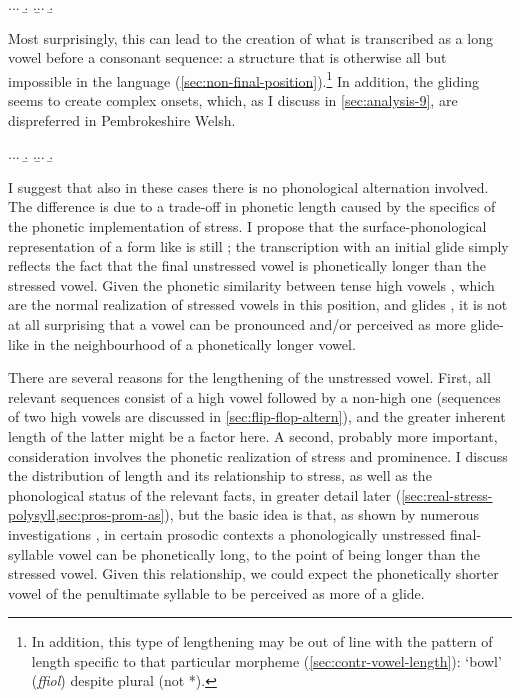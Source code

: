 \ex.\a.\label{diod}\a.
\b.
\z.\b.\label{bues}\a.
\b.

Most surprisingly, this can lead to the creation of what is transcribed as a long vowel before a consonant sequence: a structure that is otherwise all but impossible in the language (\cref{sec:non-final-position}).\footnote{In addition, this type of lengthening may be out of line with the pattern of length specific to that particular morpheme (\cref{sec:contr-vowel-length}):  `bowl' (\emph{ffiol}) despite plural \ipa{[ˈfjole]} (not *\ipa{[fjoːle]}).} In addition, the gliding seems to create complex onsets, which, as I discuss in \cref{sec:analysis-9}, are dispreferred in Pembrokeshire Welsh.

\ex.\a.\a.
\b.
\z.\b.\a.
\b.

I suggest that also in these cases there is no phonological alternation involved. The difference is due to a trade-off in phonetic length caused by the specifics of the phonetic implementation of stress. I propose that the surface\hyp phonological representation of a form like  is still \ipa{[ˈdiːolχ]}; the transcription with an initial glide simply reflects the fact that the final unstressed vowel is phonetically longer than the stressed vowel. Given the phonetic similarity between tense high vowels , which are the normal realization of stressed vowels in this position, and glides , it is not at all surprising that a vowel can be pronounced and/or perceived as more glide-like in the neighbourhood of a phonetically longer vowel.

There are several reasons for the lengthening of the unstressed vowel. First, all relevant sequences consist of a high vowel followed by a non-high one (sequences of two high vowels are discussed in \cref{sec:flip-flop-altern}), and the greater inherent length of the latter might be a factor here. A second, probably more important, consideration involves the phonetic realization of stress and prominence. I discuss the distribution of length and its relationship to stress, as well as the phonological status of the relevant facts, in greater detail later (\cref{sec:real-stress-polysyll,sec:pros-prom-as}), but the basic idea is that, as shown by numerous investigations \citep{thomas67:_welsh,rhys84:_inton,williams85:_pitch_welsh,williams-eurospeech,williams99:_welsh,ball01:_welsh_phonet}, in certain prosodic contexts a phonologically unstressed final-syllable vowel can be phonetically long, to the point of being longer than the stressed vowel. Given this relationship, we could expect the phonetically shorter vowel of the penultimate syllable to be perceived as more of a glide.

